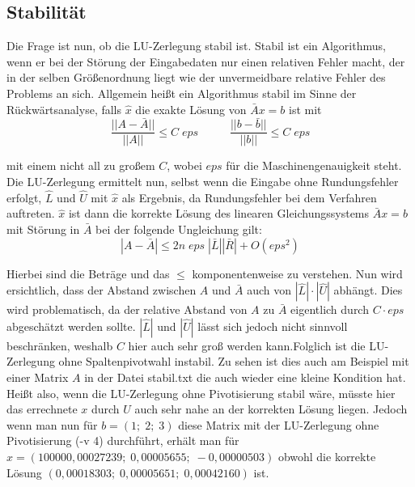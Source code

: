 \documentclass[course=erap]{aspdoc}
\begin{document}
\subsection{Stabilität}
Die Frage ist nun, ob die LU-Zerlegung stabil ist.
Stabil ist ein Algorithmus, wenn er bei der Störung der Eingabedaten nur einen relativen Fehler macht, 
der in der selben Größenordnung liegt wie der unvermeidbare relative Fehler des Problems an sich. 
Allgemein heißt ein Algorithmus stabil im Sinne der Rückwärtsanalyse, 
falls $\hat{x}$ die exakte Lösung von $\bar{A}x = b$ ist mit 	
  \begin{equation}
    \label{norm}
    \frac{|| A - \bar{A}||}{||A||} \leq C \; eps \;\; \;\;\;\;\;\;\;\;  \frac{|| b - \bar{b}||}{||b||} \leq C \; eps
  \end{equation}

mit einem nicht all zu großem $C$, wobei $eps$ für die Maschinengenauigkeit steht.
Die LU-Zerlegung ermittelt nun, selbst wenn die Eingabe ohne Rundungsfehler erfolgt, $\hat{L}$ und $\hat{U}$ mit 
$\hat{x}$ als Ergebnis, da Rundungsfehler bei dem Verfahren auftreten. $\hat{x}$ ist dann die 
korrekte Lösung des linearen Gleichungssystems $\bar{A}x=b$ mit Störung in $\bar{A}$ bei der folgende Ungleichung gilt:
  \begin{equation}
    \label{eg3}
    |A - \bar{A}| \leq 2n \; eps \; |\bar{L}||\bar{R}| + O(eps^2)
  \end{equation}

Hierbei sind die Beträge und das $\leq$ komponentenweise zu verstehen.								
Nun wird ersichtlich, dass der Abstand zwischen $A$ und $\bar{A}$ auch von $|\hat{L}| \cdot |\hat{U}|$
abhängt. Dies wird problematisch, da der relative Abstand von $A$ zu $\bar{A}$ eigentlich durch 
$C\cdot eps$ abgeschätzt werden sollte. $|\hat{L}|$ und $|\hat{U}|$ lässt sich jedoch nicht sinnvoll 
beschränken, weshalb $C$ hier auch sehr groß werden kann.Folglich ist die LU-Zerlegung ohne Spaltenpivotwahl instabil.
Zu sehen ist dies auch am Beispiel mit einer Matrix $A$ in der Datei stabil.txt die auch wieder eine kleine Kondition hat. 
Heißt also, wenn die LU-Zerlegung ohne Pivotisierung stabil wäre, müsste hier das errechnete $x$ durch $U$ auch sehr nahe 
an der korrekten Lösung liegen. Jedoch wenn man nun für $b = (1;\; 2;\; 3)$ diese Matrix mit der LU-Zerlegung ohne Pivotisierung (-v 4) 
durchführt, erhält man für $x = (100000,00027239;\; 0,00005655;\; -0,00000503)$ obwohl die korrekte Lösung 
$(0,00018303;\; 0,00005651;\; 0,00042160)$ ist. \\
\end{document}
